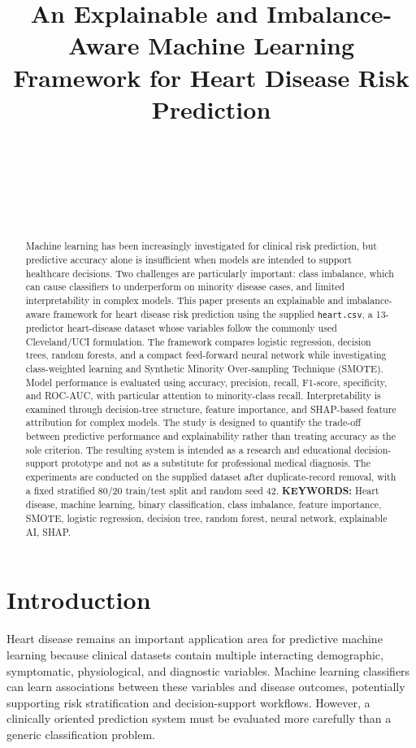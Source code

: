 \documentclass[10pt]{article}
\title{An Explainable and Imbalance-Aware Machine Learning Framework for Heart Disease Risk Prediction}
\author{
\name{Nirvaan Sinha}\\
\addr{ECE, BVCOEP}\\
\email{nsinga24-ece@bvucoep.edu.in}\\[0.15in]
\name{Sam Mendonca}\\
\addr{ECE, BVCOEP}\\
\email{smendonca24-ece@bvucoep.edu.in}
}
\begin{document}
\maketitle

\begin{abstract}
Machine learning has been increasingly investigated for clinical risk prediction, but predictive accuracy alone is insufficient when models are intended to support healthcare decisions. Two challenges are particularly important: class imbalance, which can cause classifiers to underperform on minority disease cases, and limited interpretability in complex models. This paper presents an explainable and imbalance-aware framework for heart disease risk prediction using the supplied \texttt{heart.csv}, a 13-predictor heart-disease dataset whose variables follow the commonly used Cleveland/UCI formulation. The framework compares logistic regression, decision trees, random forests, and a compact feed-forward neural network while investigating class-weighted learning and Synthetic Minority Over-sampling Technique (SMOTE). Model performance is evaluated using accuracy, precision, recall, F1-score, specificity, and ROC-AUC, with particular attention to minority-class recall. Interpretability is examined through decision-tree structure, feature importance, and SHAP-based feature attribution for complex models. The study is designed to quantify the trade-off between predictive performance and explainability rather than treating accuracy as the sole criterion. The resulting system is intended as a research and educational decision-support prototype and not as a substitute for professional medical diagnosis. The experiments are conducted on the supplied dataset after duplicate-record removal, with a fixed stratified 80/20 train/test split and random seed 42. \vspace{4pt}\textbf{KEYWORDS:} Heart disease, machine learning, binary classification, class imbalance, feature importance, SMOTE, logistic regression, decision tree, random forest, neural network, explainable AI, SHAP.\vspace{14pt}
\end{abstract}

\section{Introduction}
Heart disease remains an important application area for predictive machine learning because clinical datasets contain multiple interacting demographic, symptomatic, physiological, and diagnostic variables. Machine learning classifiers can learn associations between these variables and disease outcomes, potentially supporting risk stratification and decision-support workflows. However, a clinically oriented prediction system must be evaluated more carefully than a generic classification problem.
\end{document}
